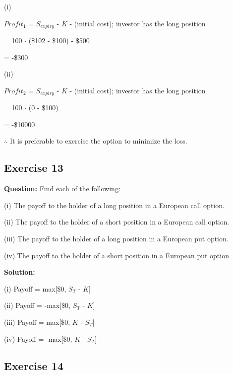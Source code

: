 \documentclass{article}
\begin{document}
(i)

$Profit_1$ = $S_{expiry}$ - $K$ - (initial cost); investor has the long position

\hspace{1.1cm}= 100 $\cdot$ (\$102 - \$100) - \$500

\hspace{1.1cm}= -\$300


(ii)

$Profit_2$  = $S_{expiry}$ - $K$ - (initial cost); investor has the long position

\hspace{1.1cm}= 100 $\cdot$ (0 - \$100)

\hspace{1.1cm}= -\$10000

$\therefore$ It is preferable to exercise the option to minimize the loss.

\subsection*{Exercise 13}

\textbf{Question:} Find each of the following:

\vspace{\baselineskip}

(i) The payoff to the holder of a long position in a European call option.

\vspace{\baselineskip}

(ii) The payoff to the holder of a short position in a European call option.

\vspace{\baselineskip}

(iii) The payoff to the holder of a long position in a European put option.

\vspace{\baselineskip}

(iv) The payoff to the holder of a short position in a European put option

\textbf{Solution:}

(i) Payoff = max[\$0, $S_T$ - $K$]

(ii) Payoff = -max[\$0, $S_T$ - $K$] 

(iii) Payoff = max[\$0, $K$ - $S_T$]

(iv) Payoff = -max[\$0, $K$ - $S_T$]

\subsection*{Exercise 14}
\end{document}
